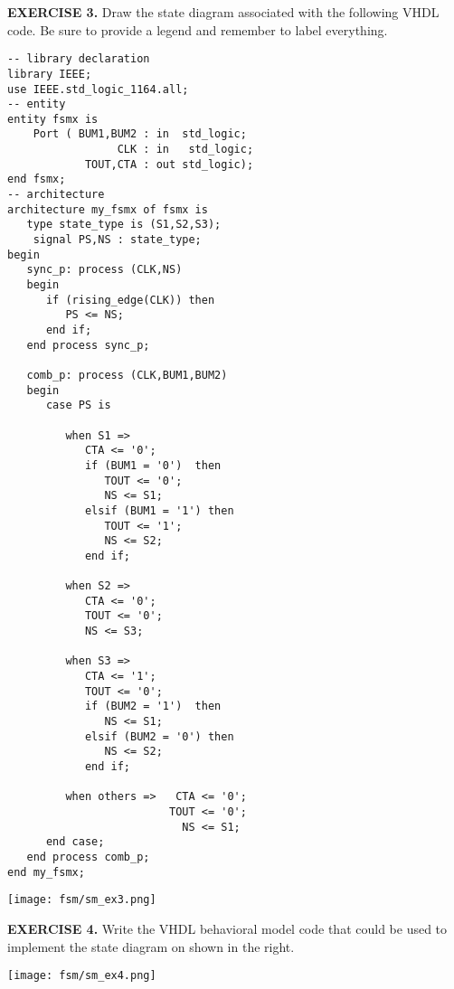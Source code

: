 \vspace{20pt}
\noindent
\begin{minipage}{1\textwidth}
\textbf{EXERCISE 3.}
Draw the state diagram associated with the following VHDL code. Be sure to provide a legend and remember to label everything.
\end{minipage}
\begin{minipage}{0.66\textwidth}
\vspace{10px}
\begin{lstlisting}
-- library declaration
library IEEE;
use IEEE.std_logic_1164.all;
-- entity
entity fsmx is
    Port ( BUM1,BUM2 : in  std_logic;
                 CLK : in   std_logic;
            TOUT,CTA : out std_logic);
end fsmx;
-- architecture
architecture my_fsmx of fsmx is
   type state_type is (S1,S2,S3); 
	signal PS,NS : state_type; 
begin
   sync_p: process (CLK,NS)
   begin
      if (rising_edge(CLK)) then   
         PS <= NS; 
      end if; 
   end process sync_p; 

   comb_p: process (CLK,BUM1,BUM2)
   begin
      case PS is 

         when S1 => 
            CTA <= '0'; 
            if (BUM1 = '0')  then 
               TOUT <= '0'; 
               NS <= S1; 
            elsif (BUM1 = '1') then 
               TOUT <= '1';  
               NS <= S2; 
            end if; 

         when S2 =>
            CTA <= '0'; 
            TOUT <= '0'; 
            NS <= S3;   

         when S3 =>
            CTA <= '1'; 
            TOUT <= '0';   
            if (BUM2 = '1')  then 
               NS <= S1; 
            elsif (BUM2 = '0') then 
               NS <= S2; 
            end if; 
      
         when others =>   CTA <= '0'; 
                         TOUT <= '0';
                           NS <= S1;
      end case; 
   end process comb_p; 
end my_fsmx;
\end{lstlisting}
\end{minipage}
\begin{minipage}{0.33\textwidth}
\texttt{[image: fsm/sm\_ex3.png]}
\vspace{250px}
\end{minipage}

\vspace{20pt}
\noindent
\begin{minipage}[t]{0.5\textwidth}
\textbf{EXERCISE 4.}
Write the VHDL behavioral model code that could be used to implement the state diagram on shown in the right.
\end{minipage}
\begin{minipage}[t]{0.47\textwidth}
\vspace{0pt}\raggedright
\centering
\texttt{[image: fsm/sm\_ex4.png]}
\end{minipage}

